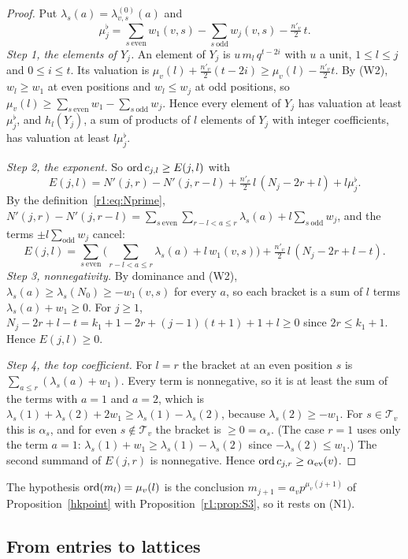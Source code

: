 \begin{proof}
Put $\lambda_s(a)=\lambda^{(0)}_{v,s}(a)$ and
\[
\mu^\flat_j=\sum_{s\ \mathrm{even}}w_1(v,s)-\sum_{s\ \mathrm{odd}}w_j(v,s)-\tfrac{n'_v}2\,t .
\]
\emph{Step 1, the elements of $Y_j$.} An element of $Y_j$ is $u\,m_l\,q^{t-2i}$ with $u$ a unit, $1\le l\le j$ and $0\le i\le t$. Its valuation is $\mu_v(l)+\frac{n'_v}2(t-2i)\ge\mu_v(l)-\frac{n'_v}2t$. By (W2), $w_l\ge w_1$ at even positions and $w_l\le w_j$ at odd positions, so $\mu_v(l)\ge\sum_{s\ \mathrm{even}}w_1-\sum_{s\ \mathrm{odd}}w_j$. Hence every element of $Y_j$ has valuation at least $\mu^\flat_j$, and $h_l(Y_j)$, a sum of products of $l$ elements of $Y_j$ with integer coefficients, has valuation at least $l\mu^\flat_j$.

\emph{Step 2, the exponent.} So $\operatorname{ord} c_{j,l}\ge E(j,l)$ with
\[
E(j,l)=N'(j,r)-N'(j,r-l)+\tfrac{n'_v}2\,l\,(N_j-2r+l)+l\mu^\flat_j .
\]
By the definition~\eqref{r1:eq:Nprime}, $N'(j,r)-N'(j,r-l)=\sum_{s\ \mathrm{even}}\sum_{r-l<a\le r}\lambda_s(a)+l\sum_{s\ \mathrm{odd}}w_j$, and the terms $\pm l\sum_{\mathrm{odd}}w_j$ cancel:
\[
E(j,l)=\sum_{s\ \mathrm{even}}\Big(\sum_{r-l<a\le r}\lambda_s(a)+l\,w_1(v,s)\Big)+\tfrac{n'_v}2\,l\,(N_j-2r+l-t).
\]
\emph{Step 3, nonnegativity.} By dominance and (W2), $\lambda_s(a)\ge\lambda_s(N_0)\ge-w_1(v,s)$ for every $a$, so each bracket is a sum of $l$ terms $\lambda_s(a)+w_1\ge0$. For $j\ge1$, $N_j-2r+l-t=k_1+1-2r+(j-1)(t+1)+1+l\ge0$ since $2r\le k_1+1$. Hence $E(j,l)\ge0$.

\emph{Step 4, the top coefficient.} For $l=r$ the bracket at an even position $s$ is $\sum_{a\le r}(\lambda_s(a)+w_1)$. Every term is nonnegative, so it is at least the sum of the terms with $a=1$ and $a=2$, which is $\lambda_s(1)+\lambda_s(2)+2w_1\ge\lambda_s(1)-\lambda_s(2)$, because $\lambda_s(2)\ge-w_1$. For $s\in\mathcal T_v$ this is $\alpha_s$, and for even $s\notin\mathcal T_v$ the bracket is $\ge0=\alpha_s$. (The case $r=1$ uses only the term $a=1$: $\lambda_s(1)+w_1\ge\lambda_s(1)-\lambda_s(2)$ since $-\lambda_s(2)\le w_1$.) The second summand of $E(j,r)$ is nonnegative. Hence $\operatorname{ord} c_{j,r}\ge\alpha_{\mathrm{ev}}(v)$.
\end{proof}

The hypothesis $\operatorname{ord}(m_l)=\mu_v(l)$ is the conclusion $m_{j+1}=a_vp^{\mu_v(j+1)}$ of Proposition~\ref{hkpoint} with Proposition~\ref{r1:prop:S3}, so it rests on (N1).

\subsection{From entries to lattices}\label{r1:sec:R1ent}

